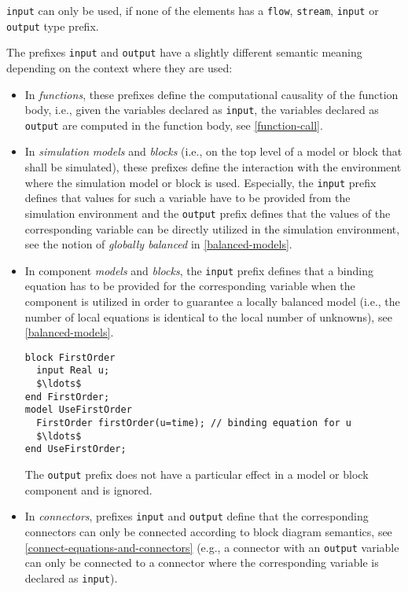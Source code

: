 \begin{example}
\lstinline!input! can only be used, if none of the elements has a \lstinline!flow!, \lstinline!stream!, \lstinline!input! or \lstinline!output! type prefix.
\end{example}

The prefixes \lstinline!input! and \lstinline!output! have a slightly different semantic meaning depending on the context where they are used:
\begin{itemize}
\item
  In \emph{functions}, these prefixes define the computational causality of the function body, i.e., given the variables declared as \lstinline!input!, the variables declared as \lstinline!output! are computed in the function body, see \cref{function-call}.
\item
  In \emph{simulation} \emph{models} and \emph{blocks} (i.e., on the top level of a model or block that shall be simulated), these prefixes define the interaction with the environment where the simulation model or block is used.
  Especially, the \lstinline!input! prefix defines that values for such a variable have to be provided from the simulation environment and the \lstinline!output! prefix defines that the values of the corresponding variable can be directly utilized in the simulation environment, see the notion of \emph{globally balanced} in \cref{balanced-models}.
\item
  In component \emph{models} and \emph{blocks}, the \lstinline!input! prefix defines that a binding equation has to be provided for the corresponding variable when the component is utilized in order to guarantee a locally balanced model (i.e., the number of local equations is identical to the local number of unknowns), see \cref{balanced-models}.
\begin{example}
\begin{lstlisting}[language=modelica]
block FirstOrder
  input Real u;
  $\ldots$
end FirstOrder;
model UseFirstOrder
  FirstOrder firstOrder(u=time); // binding equation for u
  $\ldots$
end UseFirstOrder;
\end{lstlisting}
\end{example}
  The \lstinline!output! prefix does not have a particular effect in a model or block component and is ignored.
\item
  In \emph{connectors}, prefixes \lstinline!input! and \lstinline!output! define that the corresponding connectors can only be connected according to block diagram semantics, see \cref{connect-equations-and-connectors} (e.g., a connector with an \lstinline!output! variable can only be connected to a connector where the corresponding variable is declared as \lstinline!input!).

\end{itemize}
